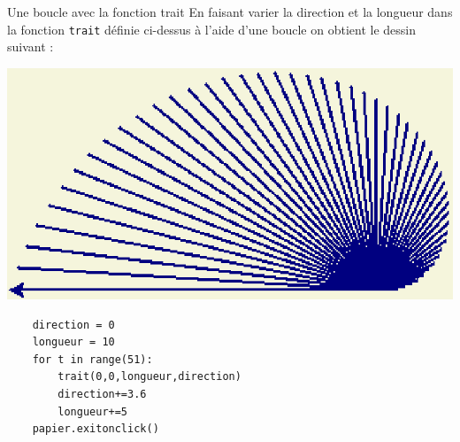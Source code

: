 \documentclass[10pt]{beamer}
\begin{document}
\begin{frame}[fragile]
	\mframe{\Python}
	\begin{exampleblock}{Une boucle avec la fonction trait}
		En faisant varier la direction et la longueur dans la fonction {\tt trait} définie ci-dessus à l'aide d'une boucle on obtient le dessin suivant :
		\begin{center}
			\includegraphics[scale=0.25]{ex-cours.eps}
		\end{center}
	\begin{lstlisting}
	direction = 0
	longueur = 10
	for t in range(51):
		trait(0,0,longueur,direction)
		direction+=3.6
		longueur+=5
	papier.exitonclick()
	\end{lstlisting}
	\end{exampleblock}
\end{frame}
\end{document}
